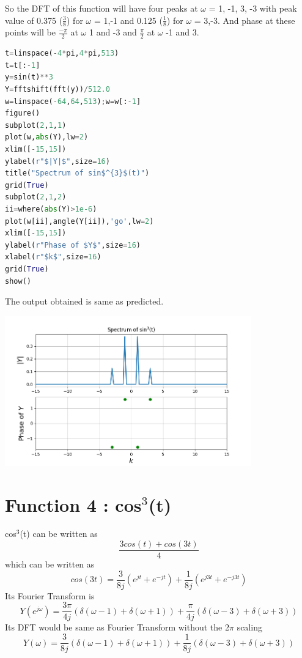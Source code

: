 \documentclass[a4paper]{article}
\begin{document}
So the DFT of this function will have four peaks at $\omega$ = 1, -1, 3, -3 with peak value of 0.375 ($\frac{3}{8}$) for $\omega$ = 1,-1 and 0.125 ($\frac{1}{8}$) for $\omega$ = 3,-3. And phase at these points will be $\frac{-\pi}{2}$ at $\omega$ 1 and -3 and $\frac{\pi}{2}$ at $\omega$ -1 and 3.
\begin{lstlisting}[language=Python]
t=linspace(-4*pi,4*pi,513)
t=t[:-1]
y=sin(t)**3
Y=fftshift(fft(y))/512.0
w=linspace(-64,64,513);w=w[:-1]
figure()
subplot(2,1,1)
plot(w,abs(Y),lw=2)
xlim([-15,15])
ylabel(r"$|Y|$",size=16)
title("Spectrum of sin$^{3}$(t)")
grid(True)
subplot(2,1,2)
ii=where(abs(Y)>1e-6)
plot(w[ii],angle(Y[ii]),'go',lw=2)
xlim([-15,15])
ylabel(r"Phase of $Y$",size=16)
xlabel(r"$k$",size=16)
grid(True)
show()
\end{lstlisting}
The output obtained is same as predicted.
\begin{center}
\includegraphics[width=0.8\textwidth]{Figure_3.png}
\end{center}

\section{Function 4 : cos$^{3}$(t)}
cos$^{3}$(t) can be written as $$ \frac{3cos(t) + cos(3t)}{4} $$
which can be written as $$cos(3t) = \frac{3}{8j}(e^{jt} + e^{-jt}) + \frac{1}{8j}(e^{j3t} + e^{-j3t})$$
Its Fourier Transform is $$Y(e^{j\omega}) = \frac{3\pi}{4j} (\delta(\omega - 1) + \delta(\omega + 1)) +  \frac{\pi}{4j} (\delta(\omega - 3) + \delta(\omega + 3))$$
Its DFT would be same as Fourier Transform without the 2$\pi$ scaling $$Y(\omega) = \frac{3}{8j} (\delta(\omega - 1) + \delta(\omega + 1)) +  \frac{1}{8j} (\delta(\omega - 3) + \delta(\omega + 3))$$
\end{document}
